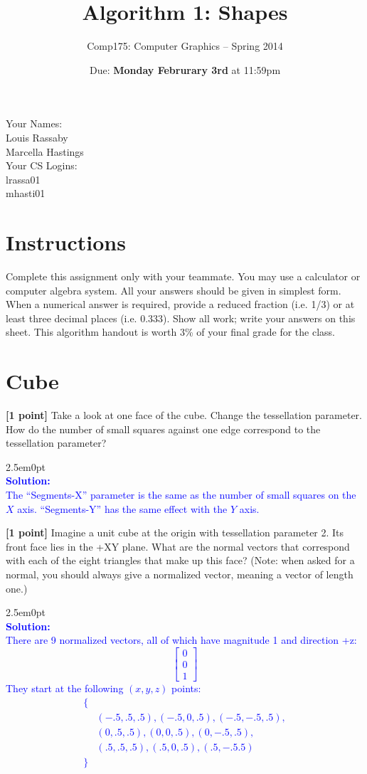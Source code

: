 \documentclass[10pt,twocolumn]{article}
\title{\Huge{\bf Algorithm 1: Shapes}}
\author{Comp175: Computer Graphics -- Spring 2014}
\date{Due:  {\bf Monday Februrary 3rd} at 11:59pm}                                           %
\newcommand{\solution}[1]{\begin{adjustwidth}{2.5em}{0pt}\textcolor{Blue}{\\{\bf Solution:} \\ #1}\\[5mm] \end{adjustwidth}}  %
\begin{document}
\maketitle
\noindent Your Names: \\
\indent Louis Rassaby\\
\indent Marcella Hastings\\[5mm]
\noindent Your CS Logins: \\
\indent lrassa01 \\
\indent mhasti01

\section{Instructions}
Complete this assignment only with your teammate. You may use a
calculator or computer algebra system. All your answers should be given in simplest form.
When a numerical answer is required, provide a reduced fraction (i.e. 1/3) or at least three
decimal places (i.e. 0.333). Show all work; write your answers on this sheet. This algorithm handout is worth 3\% of your final grade for the class.


\section{Cube}
 {\bf [1 point]} Take a look at one face of the cube. Change the tessellation parameter. How do the number of small squares against one edge correspond to the tessellation parameter?
\solution{
The ``Segments-X'' parameter is the same as the number of small squares on the $X$ axis. ``Segments-Y'' has the same effect with the $Y$ axis.
}
{\bf [1 point]} Imagine a unit cube at the origin with tessellation parameter 2. Its front face lies in the +XY plane. What are the normal vectors that correspond with each of the eight triangles that make up this face? (Note: when asked for a normal, you should always give a normalized vector, meaning a vector of length one.)
\solution{
There are 9 normalized vectors, all of which have magnitude 1 and direction +z:
\[ \begin{bmatrix} 0 \\ 0 \\ 1 \end{bmatrix} \]
They start at the following $(x, y, z)$ points: 
\begin{align*}
\{\\
& (-.5, .5, .5),
(-.5, 0, .5),
(-.5, -.5, .5),\\
&(0, .5, .5),
(0, 0, .5),
(0, -.5, .5),\\
&(.5, .5, .5),
(.5, 0, .5),
(.5, -.5 .5)\\
\}
\end{align*}
}
\end{document}
